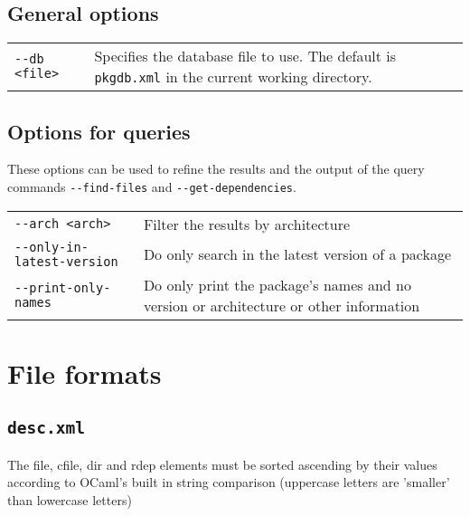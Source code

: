 \documentclass[a4paper]{article}
\newcommand{\file}[1]{\texttt{#1}}
\begin{document}
	\subsection{General options}
	\bgroup
	\def\arraystretch{1.5}
	\begin{tabularx}{\textwidth}{lX}
		\texttt{-{}-db <file>} & Specifies the database file to use. The default is \file{pkgdb.xml} in the current working directory.
	\end{tabularx}
	\egroup
	
	\subsection{Options for queries}
	
	These options can be used to refine the results and the output of the query commands \texttt{-{}-find-files} and \texttt{-{}-get-dependencies}.
	
	\bgroup
	\def\arraystretch{1.5}
	\begin{tabularx}{\textwidth}{lX}
		\texttt{-{}-arch <arch>} & Filter the results by architecture \\
		
		\texttt{-{}-only-in-latest-version} & Do only search in the latest version of a package \\
		
		\texttt{-{}-print-only-names} & Do only print the package's names and no version or architecture or other information \\
	\end{tabularx}
	\egroup
	
	\section{File formats}
	\label{sec:file_formats}
	
	\subsection{\file{desc.xml}}
	\label{sec:desc.xml}
	

	\vspace{1em}
	The file, cfile, dir and rdep elements must be sorted ascending by their values according to OCaml's built in string comparison (uppercase letters are 'smaller' than lowercase letters)
	
\end{document}
